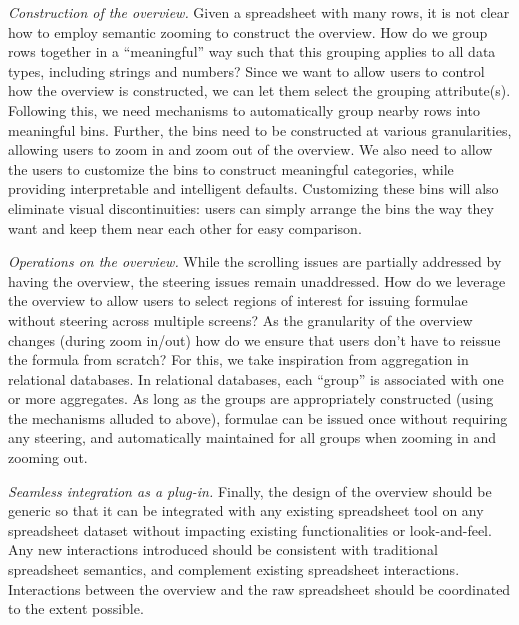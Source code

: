 \item {\em Construction of the overview.}
Given a spreadsheet
with many rows,
it is not clear how to employ semantic zooming
to construct the overview.
How do we group rows together in a ``meaningful''
way
such that this grouping applies to all 
data types, including strings and numbers?
Since we want to allow users to control how the overview
is constructed, we can let them select the grouping
attribute(s).
Following this, we need mechanisms to automatically group nearby rows
into meaningful bins.
Further, the bins need to be constructed
at various granularities,
allowing users to zoom in and zoom out of the overview.
We also need to allow the users
to customize the bins
to construct meaningful categories, while providing
interpretable and intelligent defaults.
Customizing these bins will also eliminate
visual discontinuities: users can simply arrange the bins
the way they want and keep them near each other
for easy comparison.

\item {\em Operations on the overview.}
While the scrolling issues are partially addressed
by having the overview, the steering issues remain unaddressed.
How do we leverage the overview to allow users
to select regions of interest for issuing formulae
without steering
across multiple screens?
As the granularity of the overview changes (during zoom in/out)
how do we ensure that users don't have to reissue the formula from scratch?
For this, we take inspiration from aggregation
in relational databases. In relational databases, each ``group'' is associated
with one or more aggregates. As long as the groups are
appropriately constructed (using the mechanisms alluded to above),
formulae can be issued once without requiring any steering, and
automatically maintained for all groups when
zooming in and zooming out.

\item {\em Seamless integration as a plug-in.}
Finally, the design of the overview
should be generic so that it can be integrated
with any existing spreadsheet tool on any spreadsheet
dataset without impacting
existing functionalities or look-and-feel.
Any new interactions introduced should be consistent
with traditional spreadsheet semantics,
and complement existing spreadsheet interactions.
Interactions between the overview and the raw spreadsheet
should be coordinated to the extent possible.




\squishend
 

